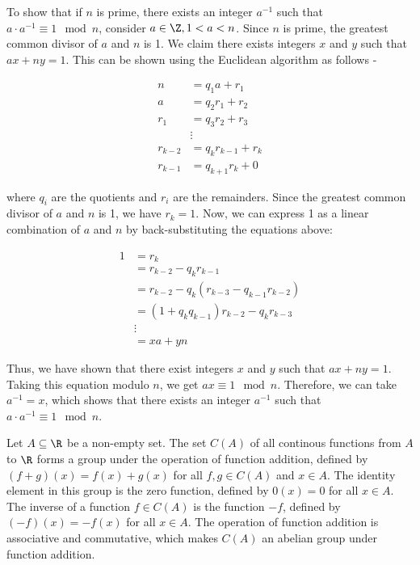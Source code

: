 \documentclass[openany]{book}
\begin{document}
\begin{mynote}
    To show that if $n$ is prime, there exists an integer $a^{-1}$ such that $a \cdot a^{-1} \equiv 1 \mod n$, consider $a \in \Z, 1 < a < n$. Since $n$ is prime, the greatest common divisor of $a$ and $n$ is 1. We claim there exists integers $x$ and $y$ such that $ax + ny = 1$. This can be shown using the Euclidean algorithm as follows -
\begin{center}
\begin{align*}
    n &= q_1 a + r_1 \\
    a &= q_2 r_1 + r_2 \\
    r_1 &= q_3 r_2 + r_3 \\
    &\vdots \\
    r_{k-2} &= q_k r_{k-1} + r_k \\
    r_{k-1} &= q_{k+1} r_k + 0
\end{align*}
\end{center}
where $q_i$ are the quotients and $r_i$ are the remainders. Since the greatest common divisor of $a$ and $n$ is 1, we have $r_k = 1$. Now, we can express 1 as a linear combination of $a$ and $n$ by back-substituting the equations above:
\begin{center}
\begin{align*}
    1 &= r_k \\
    &= r_{k-2} - q_k r_{k-1} \\
    &= r_{k-2} - q_k (r_{k-3} - q_{k-1} r_{k-2}) \\
    &= (1 + q_k q_{k-1}) r_{k-2} - q_k r_{k-3} \\
    &\vdots \\
    &= x a + y n
\end{align*}
\end{center}
Thus, we have shown that there exist integers $x$ and $y$ such that $ax + ny = 1$. Taking this equation modulo $n$, we get $ax \equiv 1 \mod n$. Therefore, we can take $a^{-1} = x$, which shows that there exists an integer $a^{-1}$ such that $a \cdot a^{-1} \equiv 1 \mod n$.
\end{mynote}
\begin{example}
    Let $A \subseteq \R$ be a non-empty set. The set $C(A)$ of all continous functions from $A$ to $\R$ forms a group under the operation of function addition, defined by $(f + g)(x) = f(x) + g(x)$ for all $f, g \in C(A)$ and $x \in A$. The identity element in this group is the zero function, defined by $0(x) = 0$ for all $x \in A$. The inverse of a function $f \in C(A)$ is the function $-f$, defined by $(-f)(x) = -f(x)$ for all $x \in A$. The operation of function addition is associative and commutative, which makes $C(A)$ an abelian group under function addition.
\end{example}
\end{document}
